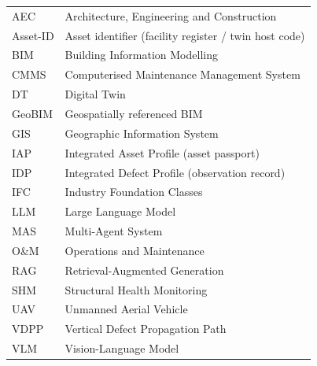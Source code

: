 
\begin{tabular}{ll}
AEC & Architecture, Engineering and Construction\\
Asset-ID & Asset identifier (facility register / twin host code)\\
BIM & Building Information Modelling\\
CMMS & Computerised Maintenance Management System\\
DT & Digital Twin\\
GeoBIM & Geospatially referenced BIM\\
GIS & Geographic Information System\\
IAP & Integrated Asset Profile (asset passport)\\
IDP & Integrated Defect Profile (observation record)\\
IFC & Industry Foundation Classes\\
LLM & Large Language Model\\
MAS & Multi-Agent System\\
O\&M & Operations and Maintenance\\
RAG & Retrieval-Augmented Generation\\
SHM & Structural Health Monitoring\\
UAV & Unmanned Aerial Vehicle\\
VDPP & Vertical Defect Propagation Path\\
VLM & Vision-Language Model\\
\end{tabular}
